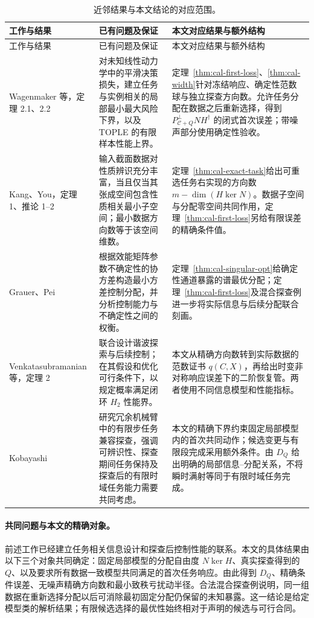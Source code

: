 \documentclass[11pt,a4paper]{article}
\numberwithin{equation}{section}
\theoremstyle{definition}
\begin{document}
\begin{center}\small
\renewcommand{\arraystretch}{1.2}
\begin{longtable}{p{.19\linewidth}p{.36\linewidth}p{.36\linewidth}}
\caption{近邻结果与本文结论的对应范围。}\label{tab:rev-related}\\
\toprule
工作与结果 & 已有问题及保证 & 本文对应结果与额外结构\\
\midrule
\endfirsthead
\toprule 工作与结果 & 已有问题及保证 & 本文对应结果与额外结构\\\midrule
\endhead
\bottomrule\endfoot
Wagenmaker 等\cite{wagenmaker2021}，定理 2.1、2.2
& 对未知线性动力学中的平滑决策损失，建立任务与实例相关的局部最小最大风险下界，以及 TOPLE 的有限样本性能上界。
& 定理~\ref{thm:cal-first-loss}、\ref{thm:cal-width}针对冻结响应、确定性范数球与独立探查方向数。允许任务分配在数据之后重新选择，得到 $P_{\mathcal C+Q}^{\perp}NH^\dagger$ 的闭式首次误差；带噪声部分使用确定性验收。\\
Kang、You\cite{kang2023}，定理 1、推论 1--2
& 输入截面数据对性质辨识充分丰富，当且仅当其张成空间包含性质相关最小子空间；最小数据方向数等于该空间维数。
& 定理~\ref{thm:cal-exact-task}给出可重选任务右实现的方向数 $m-\dim(H\ker N)$。数据子空间与分配零空间共同作用，定理~\ref{thm:cal-first-loss}另给有限误差的精确条件值。\\
Grauer、Pei\cite{grauer2022}
& 根据效能矩阵参数不确定性的协方差构造最小方差控制分配，并分析控制能力与不确定性之间的权衡。
& 定理~\ref{thm:cal-singular-opt}给确定性通道暴露的谱最优分配；定理~\ref{thm:cal-first-loss}及混合探查例进一步将实际信息与后续分配联合刻画。\\
Ven\-kata\-subra\-manian 等\cite{venkata2024}，定理 2
& 联合设计谐波探索与后续控制；在其假设和优化可行条件下，以规定概率满足闭环 $H_2$ 性能界。
& 本文从精确方向数转到实际数据的范数证书 $q(C,X)$，再给出时变非对称响应误差下的二阶恢复管。两者使用不同信息模型和性能指标。\\
Kobayashi\cite{kobayashi2026}
& 研究冗余机械臂中的有限步任务兼容探查，强调可辨识性、探查期间任务保持及探查后的有限时域任务能力需要共同考虑。
& 本文的精确下界约束固定局部模型内的首次共同动作；候选变更与有限段完成采用额外条件。由 $D_Q$ 给出明确的局部信息--分配关系，不将瞬时满射等同于有限时域任务完成。\\
\end{longtable}
\end{center}

\paragraph{共同问题与本文的精确对象。}
前述工作已经建立任务相关信息设计和探查后控制性能的联系。本文的具体结果由以下三个对象共同确定：固定局部模型的分配自由度 $N\ker H$、真实探查得到的 $Q$、以及要求所有数据一致模型共同满足的首次任务响应。由此得到 $D_Q$、精确条件误差、无噪声精确方向数和最小致秩亏扰动半径。合法混合探查例说明，同一组数据在重新选择分配以后可消除最初固定分配仍保留的未知暴露。这一结论是给定模型类的解析结果；有限候选选择的最优性始终相对于声明的候选与可行合同。
\end{document}
